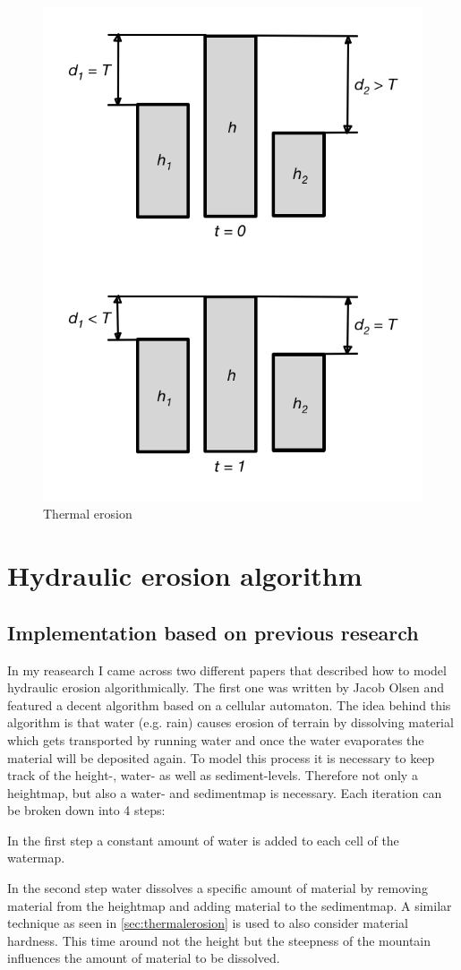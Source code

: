 \documentclass[11pt,a4paper,twoside,openright]{report}
\begin{document}
\begin{figure}[h]
\centering
\includegraphics[width=0.5\linewidth]{thermalerosion.png}
\caption{Thermal erosion}\label{fig:thermalerosion}
\end{figure}

\section{Hydraulic erosion algorithm}
\subsection{Implementation based on previous research}
In my reasearch I came across two different papers that described how to model hydraulic erosion algorithmically. The first one \cite{Olsen:2004} was written by Jacob Olsen and featured a decent algorithm based on a cellular automaton. The idea behind this algorithm is that water (e.g. rain) causes erosion of terrain by dissolving material which gets transported by running water and once the water evaporates the material will be deposited again. To model this process it is necessary to keep track of the height-, water- as well as sediment-levels. Therefore not only a heightmap, but also a water- and sedimentmap is necessary. Each iteration can be broken down into 4 steps:

In the first step a constant amount of water is added to each cell of the watermap.

In the second step water dissolves a specific amount of material by removing material from the heightmap and adding material to the sedimentmap. A similar technique as seen in \cref{sec:thermalerosion} is used to also consider material hardness. This time around not the height but the steepness of the mountain influences the amount of material to be dissolved.
\end{document}

